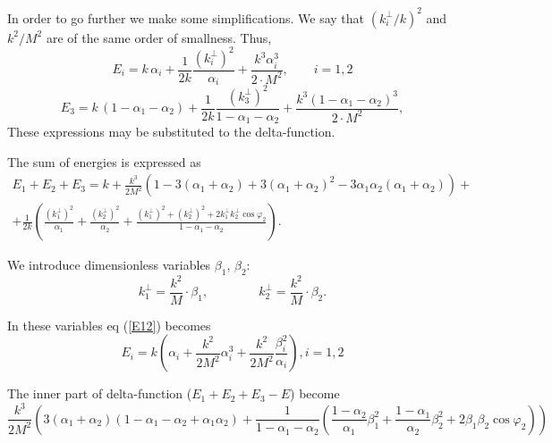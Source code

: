 \documentclass[12pt]{article}
\begin{document}
In order to go further we make some simplifications. We say that $(k_i^\perp/k)^2$ and $k^2/M^2$ are of the same order of smallness. Thus,
\begin{equation}
\label{E12}
E_i = k\,\alpha_i + \frac{1}{2k}\frac{\left(k_i^\perp\right)^2}{\alpha_i} + \frac{k^3\alpha_i^3}{2\cdot M^2}, \qquad i=1,2
\end{equation}
\begin{equation}
\label{E3}
E_{3} = k\,(1-\alpha_1 - \alpha_2) + \frac{1}{2k}\frac{\left(k_{3}^\perp\right)^2}{1-\alpha_1 - \alpha_2} + \frac{k^3(1-\alpha_1 - \alpha_2)^3}{2\cdot M^2},
\end{equation}
These expressions may be substituted to the delta-function.

The sum of energies is expressed as
\begin{align}
E_1 + E_2 + E_3 = k + \frac{k^3}{2M^2}\left(1 - 3(\alpha_1+\alpha_2)+3(\alpha_1+\alpha_2)^2-3\alpha_1\alpha_2(\alpha_1+\alpha_2) \right)+\\
+ \frac{1}{2k}\left( \frac{(k_1^\perp)^2}{\alpha_1} + \frac{(k_2^\perp)^2}{\alpha_2} + \frac{(k_1^\perp)^2+(k_2^\perp)^2+2k_1^\perp k_2^\perp \cos \varphi_2}{1-\alpha_1-\alpha_2} \right).
\end{align}

We introduce dimensionless variables $\beta_1$, $\beta_2$:
\begin{equation}
k_1^\perp = \frac{k^2}{M}\cdot \beta_1, \qquad \qquad  k_2^\perp = \frac{k^2}{M}\cdot \beta_2.
\end{equation}

In these variables eq (\ref{E12}) becomes
\begin{equation}
    E_i=k\left( \alpha_i + \frac{k^2}{2M^2} \alpha^3_i +  \frac{k^2}{2M^2} \frac{\beta^2_i}{\alpha_i}\right), i=1,2
\end{equation}

 
The inner part of delta-function ($E_1+E_2+E_3-E$) become
\begin{equation}
   \frac{k^3}{2M^2} \left( 3(\alpha_1+\alpha_2)(1-\alpha_1-\alpha_2 + \alpha_1\alpha_2) + \frac{1}{1-\alpha_1-\alpha_2}\left( \frac{1-\alpha_2}{\alpha_1}\beta_1^2 + \frac{1-\alpha_1}{\alpha_2}\beta_2^2 + 2\beta_1 \beta_2 \cos \varphi_2 \right) \right)   
\end{equation}
\end{document}
